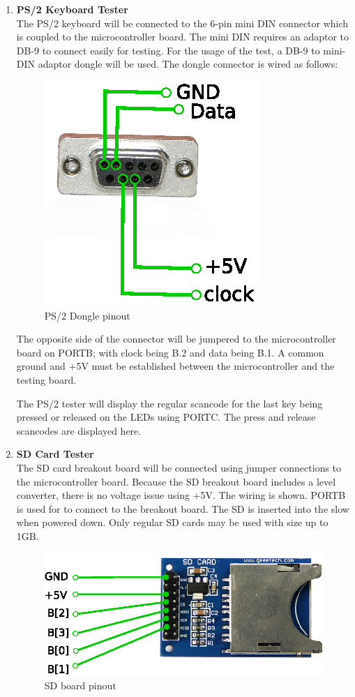 \documentclass[bibtotocnumbered,abstract=on,paper=a4,fontsize=12pt,parskip=on,halfparskip=on]{scrartcl}		%
\begin{document}
\begin{enumerate}
    \item{\textbf{PS/2 Keyboard Tester}}\hfill \\
    The PS/2 keyboard will be connected to the 6-pin mini DIN connector which is coupled to the microcontroller board. The mini DIN requires an adaptor to DB-9 to connect easily for testing. For the usage of the test, a DB-9 to mini-DIN adaptor dongle will be used. The dongle connector is wired as follows:
  \begin{figure}[H]
    \centering
      \includegraphics[]{img/testdoc_dongle}
      \caption{PS/2 Dongle pinout}
  \end{figure}

    The opposite side of the connector will be jumpered to the microcontroller board on PORTB; with clock being B.2 and data being B.1. A common ground and +5V must be established between the microcontroller and the testing board.

    The PS/2 tester will display the regular scancode for the last key being pressed or released on the LEDs using PORTC. The press and release scancodes are displayed here.
    \item{\textbf{SD Card Tester}}\hfill \\
    The SD card breakout board will be connected using jumper connections to the microcontroller board. Because the SD breakout board includes a level converter, there is no voltage issue using +5V. The wiring is shown. PORTB is used for to connect to the breakout board. The SD is inserted into the slow when powered down. Only regular SD cards may be used with size up to 1GB.
  \begin{figure}[H]
    \centering
      \includegraphics[]{img/testdoc_sd}
      \caption{SD board pinout}
  \end{figure}


\end{enumerate}
\end{document}
